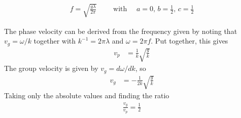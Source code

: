 \begin{align*}
    \boxed{
    f = \sqrt{\frac{gλ}{2π}}
	\quad\quad\text{ with }\quad a = 0,\, b = \frac 12,\, c = \frac 12
    }
\end{align*}

The phase velocity can be derived from the frequency given by noting that
$v_g = ω/k$ together with $k^{-1} = 2πλ$ and $ω = 2πf$. Put together, this
gives
\begin{align*}
    v_p &= \frac{1}{k}\sqrt{\frac{g}{k}}
\end{align*}
The group velocity is given by $v_g = dω/dk$, so
\begin{align*}
    v_g &= -\frac{1}{2k}\sqrt{\frac{g}{k}}
\end{align*}
Taking only the absolute values and finding the ratio
\begin{align}
    \boxed{\frac{v_g}{v_p} = \frac 12}
\end{align}
